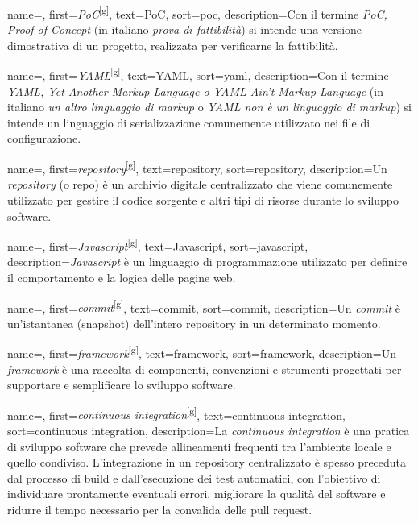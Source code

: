  {
    name=,
    first={\textit{PoC}\textsuperscript{[g]}},
    text=PoC,
    sort=poc,
    description={Con il termine \textit{PoC, Proof of Concept} (in italiano \textit{prova di fattibilità}) si intende una versione dimostrativa di un progetto, realizzata per verificarne la fattibilità.}
}

 {
    name=,
    first={\textit{YAML}\textsuperscript{[g]}},
    text=YAML,
    sort=yaml,
    description={Con il termine \textit{YAML, Yet Another Markup Language o YAML Ain’t Markup Language} (in italiano \textit{un altro linguaggio di markup} o \textit{YAML non è un linguaggio di markup}) si intende un linguaggio di serializzazione comunemente utilizzato nei file di configurazione.}
}

 {
    name=,
    first={\textit{repository}\textsuperscript{[g]}},
    text=repository,
    sort=repository,
    description={Un \textit{repository} (o repo) è un archivio digitale centralizzato che viene comunemente utilizzato per gestire il codice sorgente e altri tipi di risorse durante lo sviluppo software.}
}

 {
    name=,
    first={\textit{Javascript}\textsuperscript{[g]}},
    text=Javascript,
    sort=javascript,
    description={\textit{Javascript} è un linguaggio di programmazione utilizzato per definire il comportamento e la logica delle pagine web.}
}

 {
    name=,
    first={\textit{commit}\textsuperscript{[g]}},
    text=commit,
    sort=commit,
    description={Un \textit{commit} è un'istantanea (snapshot) dell’intero \gls{repository} in un determinato momento.}
}

 {
    name=,
    first={\textit{framework}\textsuperscript{[g]}},
    text=framework,
    sort=framework,
    description={Un \textit{framework} è una raccolta di componenti, convenzioni e strumenti progettati per supportare e semplificare lo sviluppo software.}
}

 {
    name=,
    first={\textit{continuous integration}\textsuperscript{[g]}},
    text=continuous integration,
    sort=continuous integration,
    description={La \textit{continuous integration} è una pratica di sviluppo software che prevede allineamenti frequenti tra l’ambiente locale e quello condiviso. L’integrazione in un \gls{repository} centralizzato è spesso preceduta dal processo di build e dall’esecuzione dei test automatici, con l’obiettivo di individuare prontamente eventuali errori, migliorare la qualità del software e ridurre il tempo necessario per la convalida delle \gls{pull request}.}
}

